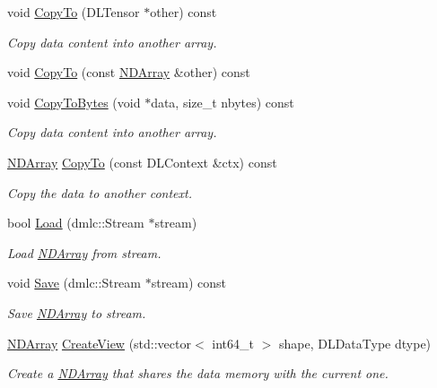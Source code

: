 \begin{DoxyCompactItemize}
void \hyperlink{classtvm_1_1runtime_1_1NDArray_a9b53b82c11b6eedb4e1f11d6cf769651}{Copy\+To} (D\+L\+Tensor $\ast$other) const 
\begin{DoxyCompactList}\small\item\em Copy data content into another array. \end{DoxyCompactList}\item 
void \hyperlink{classtvm_1_1runtime_1_1NDArray_ace36fc5c52063d56e616ba9d4c8671f6}{Copy\+To} (const \hyperlink{classtvm_1_1runtime_1_1NDArray}{N\+D\+Array} \&other) const 
\item 
void \hyperlink{classtvm_1_1runtime_1_1NDArray_a69726ab0ad5204fea12960dd43b4f8e2}{Copy\+To\+Bytes} (void $\ast$data, size\+\_\+t nbytes) const 
\begin{DoxyCompactList}\small\item\em Copy data content into another array. \end{DoxyCompactList}\item 
\hyperlink{classtvm_1_1runtime_1_1NDArray}{N\+D\+Array} \hyperlink{classtvm_1_1runtime_1_1NDArray_a4ce4ee0a7bcbb466c3258a50b5878b07}{Copy\+To} (const D\+L\+Context \&ctx) const 
\begin{DoxyCompactList}\small\item\em Copy the data to another context. \end{DoxyCompactList}\item 
bool \hyperlink{classtvm_1_1runtime_1_1NDArray_ad78792a1e1feb160b0be4474a4c13a4c}{Load} (dmlc\+::\+Stream $\ast$stream)
\begin{DoxyCompactList}\small\item\em Load \hyperlink{classtvm_1_1runtime_1_1NDArray}{N\+D\+Array} from stream. \end{DoxyCompactList}\item 
void \hyperlink{classtvm_1_1runtime_1_1NDArray_acc22b8911190353ab1050cccf3d015f2}{Save} (dmlc\+::\+Stream $\ast$stream) const 
\begin{DoxyCompactList}\small\item\em Save \hyperlink{classtvm_1_1runtime_1_1NDArray}{N\+D\+Array} to stream. \end{DoxyCompactList}\item 
\hyperlink{classtvm_1_1runtime_1_1NDArray}{N\+D\+Array} \hyperlink{classtvm_1_1runtime_1_1NDArray_a368d0f65ebf07dc2ee5a717a85b3bc60}{Create\+View} (std\+::vector$<$ int64\+\_\+t $>$ shape, D\+L\+Data\+Type dtype)
\begin{DoxyCompactList}\small\item\em Create a \hyperlink{classtvm_1_1runtime_1_1NDArray}{N\+D\+Array} that shares the data memory with the current one. \end{DoxyCompactList}\item 

\end{DoxyCompactItemize}
